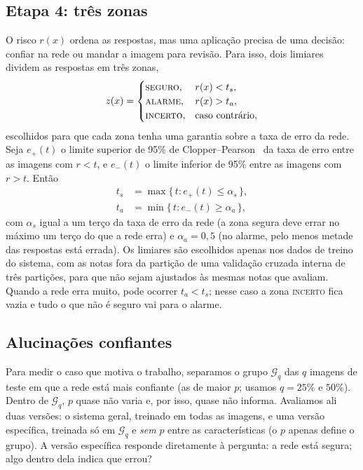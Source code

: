 \documentclass[conference,a4paper]{IEEEtran}
\begin{document}
\subsection{Etapa 4: três zonas}
\label{sec:zonas}
O risco $r(x)$ ordena as respostas, mas uma aplicação precisa de uma decisão: confiar na rede ou mandar a imagem para revisão.
Para isso, dois limiares dividem as respostas em três zonas,
\begin{equation}
  z(x) = \begin{cases}
    \textsc{seguro},  & r(x) < t_s,\\
    \textsc{alarme},  & r(x) > t_a,\\
    \textsc{incerto}, & \text{caso contrário},
  \end{cases}
  \label{eq:zonas}
\end{equation}
escolhidos para que cada zona tenha uma garantia sobre a taxa de erro da rede. Seja $e_+(t)$ o limite superior de 95\% de
Clopper--Pearson~\cite{clopper1934} da taxa de erro entre as imagens com $r < t$, e $e_-(t)$ o limite inferior de 95\% entre as imagens
com $r > t$. Então
\begin{align}
  t_s &= \max\{\, t : e_+(t) \le \alpha_s \,\}, \nonumber\\
  t_a &= \min\{\, t : e_-(t) \ge \alpha_a \,\},
  \label{eq:limiares}
\end{align}
com $\alpha_s$ igual a um terço da taxa de erro da rede (a zona segura deve errar no máximo um terço do que a rede erra) e
$\alpha_a = 0{,}5$ (no alarme, pelo menos metade das respostas está errada). Os limiares são escolhidos apenas nos dados de treino do
sistema, com as notas fora da partição de uma validação cruzada interna de três partições, para que não sejam ajustados às mesmas
notas que avaliam. Quando a rede erra muito, pode ocorrer $t_a < t_s$; nesse caso a zona \textsc{incerto} fica vazia e tudo o que não é
seguro vai para o alarme.

\subsection{Alucinações confiantes}
\label{sec:confiantes}
Para medir o caso que motiva o trabalho, separamos o grupo $\mathcal{G}_q$ das $q$ imagens de teste em que a rede está mais confiante
(as de maior $p$; usamos $q = 25\%$ e $50\%$). Dentro de $\mathcal{G}_q$, $p$ quase não varia e, por isso, quase não informa. Avaliamos
ali duas versões: o sistema geral, treinado em todas as imagens, e uma versão específica, treinada só em $\mathcal{G}_q$ e
\emph{sem} $p$ entre as características (o $p$ apenas define o grupo). A versão específica responde diretamente à pergunta: a rede está
segura; algo dentro dela indica que errou?
\end{document}
